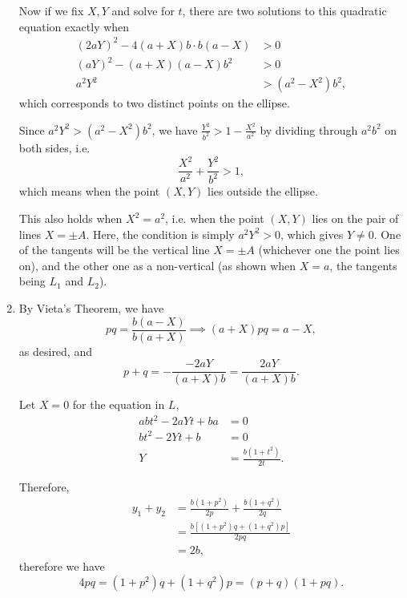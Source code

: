 \begin{enumerate}
          Now if we fix \(X, Y\) and solve for \(t\), there are two solutions to this quadratic equation exactly when
          \begin{align*}
              (2aY)^2 - 4(a+X)b \cdot b(a-X) & >0              \\
              (aY)^2 - (a+X)(a-X)b^2         & >0              \\
              a^2Y^2                         & > (a^2-X^2)b^2,
          \end{align*}
          which corresponds to two distinct points on the ellipse.

          Since \(a^2 Y^2 > (a^2 - X^2) b^2\), we have \(\frac{Y^2}{b^2} > 1 - \frac{X^2}{a^2}\) by dividing through \(a^2 b^2\) on both sides, i.e.
          \[
              \frac{X^2}{a^2} + \frac{Y^2}{b^2} > 1,
          \]
          which means when the point \((X, Y)\) lies outside the ellipse.

          This also holds when \(X^2 = a^2\), i.e. when the point \((X, Y)\) lies on the pair of lines \(X = \pm A\). Here, the condition is simply \(a^2 Y^2 > 0\), which gives \(Y \neq 0\). One of the tangents will be the vertical line \(X = \pm A\) (whichever one the point lies on), and the other one as a non-vertical (as shown when \(X = a\), the tangents being \(L_1\) and \(L_2\)).

          \begin{center}
              
          \end{center}

    \item By Vieta's Theorem, we have
          \[
              pq = \frac{b(a-X)}{b(a+X)} \implies (a+X) pq = a-X,
          \]
          as desired, and
          \[
              p + q = -\frac{-2aY}{(a+X)b} = \frac{2aY}{(a+X)b}.
          \]

          Let \(X = 0\) for the equation in \(L\),
          \begin{align*}
              abt^2 - 2aYt + ba & = 0                    \\
              bt^2 - 2Yt + b    & = 0                    \\
              Y                 & = \frac{b(1+t^2)}{2t}.
          \end{align*}

          Therefore,
          \begin{align*}
              y_1 + y_2 & = \frac{b(1+p^2)}{2p} + \frac{b(1+q^2)}{2q}     \\
                        & = \frac{b\left[(1+p^2)q + (1+q^2)p\right]}{2pq} \\
                        & = 2b,
          \end{align*}
          therefore we have
          \[
              4pq = (1+p^2)q + (1+q^2)p = (p+q)(1 + pq).
          \]


\end{enumerate}
